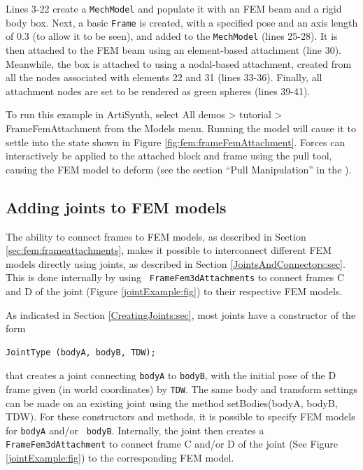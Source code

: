 \lstset{numbers=none} 
Lines 3-22 create a {\tt MechModel} and populate it with an FEM beam
and a rigid body box. Next, a basic {\tt Frame} is created, with a
specified pose and an axis length of 0.3 (to allow it to be seen), and
added to the {\tt MechModel} (lines 25-28). It is then attached to the
FEM beam using an element-based attachment (line 30).  Meanwhile, the
box is attached to using a nodal-based attachment, created from all
the nodes associated with elements 22 and 31 (lines 33-36). Finally,
all attachment nodes are set to be rendered as green spheres (lines
39-41).

To run this example in ArtiSynth, select {\sf All demos > tutorial >
FrameFemAttachment} from the {\sf Models} menu. Running the model will
cause it to settle into the state shown in Figure
\ref{fig:fem:frameFemAttachment}. Forces can interactively
be applied to the attached block and frame using the
pull tool, causing the FEM model to deform 
(see the section ``Pull Manipulation'' in the
).

\subsection{Adding joints to FEM models}
\label{FEMJoints:sec}

The ability to connect frames to FEM models, as described in Section
\ref{sec:fem:frameattachments}, makes it possible to interconnect
different FEM models directly using joints, as described in Section
\ref{JointsAndConnectors:sec}. This is done internally by using {\tt
FrameFem3dAttachments} to connect frames C and D of the joint (Figure
\ref{jointExample:fig}) to their respective FEM models.

As indicated in Section \ref{CreatingJoints:sec}, most
joints have a constructor of the form
%
\begin{lstlisting}[]
  JointType (bodyA, bodyB, TDW);
\end{lstlisting}
%
that creates a joint connecting {\tt bodyA} to {\tt bodyB}, with the
initial pose of the D frame given (in world coordinates) by {\tt TDW}.
The same body and transform settings can be made on an existing joint
using the method %
{setBodies(bodyA, bodyB, TDW)}.  For these constructors and methods,
it is possible to specify FEM models for {\tt bodyA} and/or {\tt
bodyB}. Internally, the joint then creates a {\tt
FrameFem3dAttachment} to connect frame C and/or D of the joint (See
Figure \ref{jointExample:fig}) to the corresponding FEM model.

